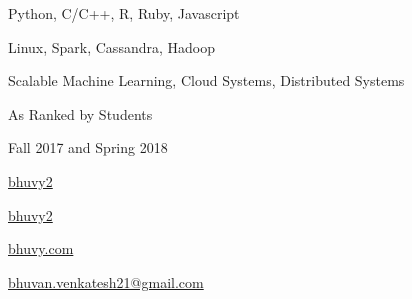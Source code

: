 \documentclass[11pt, a4paper]{awesome-cv}
\begin{document}
\makecvheader[C]
\vspace{-20pt}
\begin{minipage}[t]{0.75\textwidth}
\raggedright


%

\end{minipage}\quad
\begin{minipage}[t]{0.2\textwidth}
\raggedright
{}

\medskip
{}

Python, C/C++, R, Ruby, Javascript

\bigskip
{}

Linux, Spark, Cassandra, Hadoop

\bigskip
{}

Scalable Machine Learning,
Cloud Systems,
Distributed Systems


\bigskip


As Ranked by Students

\medskip


Fall 2017 and Spring 2018


\bigskip
{
\Large
\href{https://github.com/bhuvy2}{\faGithubSquare\acvHeaderIconSep bhuvy2}

\medskip

\href{https://linkedin.com/in/bhuvy2}{\faLinkedinSquare\acvHeaderIconSep bhuvy2}

\medskip

\href{https://bhuvy.com}{\faHome\acvHeaderIconSep bhuvy.com}
}

\end{minipage}%

\makecvfooter
  {}
  {{\Large \href{mailto:bhuvan.venkatesh21@gmail.com}{\faEnvelope\acvHeaderIconSep bhuvan.venkatesh21@gmail.com}  } }
  {}


\end{document}
